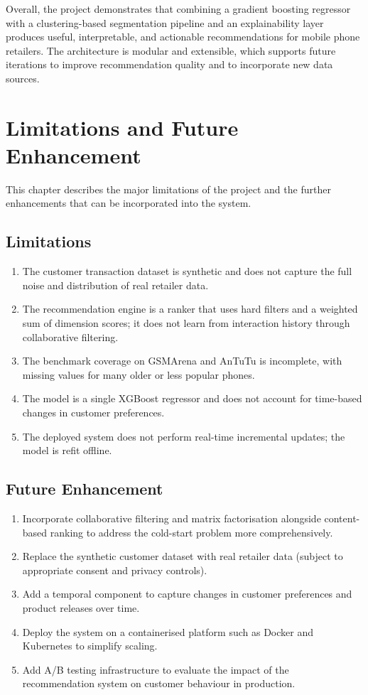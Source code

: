 \documentclass[12pt]{report}
\numberwithin{figure}{chapter}
\numberwithin{table}{chapter}
\numberwithin{equation}{chapter}
\begin{document}
Overall, the project demonstrates that combining a gradient boosting regressor with a clustering-based segmentation pipeline and an explainability layer produces useful, interpretable, and actionable recommendations for mobile phone retailers. The architecture is modular and extensible, which supports future iterations to improve recommendation quality and to incorporate new data sources.

\chapter{Limitations and Future Enhancement}
This chapter describes the major limitations of the project and the further enhancements that can be incorporated into the system.

\section{Limitations}

\begin{enumerate}
    \item The customer transaction dataset is synthetic and does not capture the full noise and distribution of real retailer data.
    \item The recommendation engine is a ranker that uses hard filters and a weighted sum of dimension scores; it does not learn from interaction history through collaborative filtering.
    \item The benchmark coverage on GSMArena and AnTuTu is incomplete, with missing values for many older or less popular phones.
    \item The model is a single XGBoost regressor and does not account for time-based changes in customer preferences.
    \item The deployed system does not perform real-time incremental updates; the model is refit offline.
\end{enumerate}

\section{Future Enhancement}

\begin{enumerate}
    \item Incorporate collaborative filtering and matrix factorisation alongside content-based ranking to address the cold-start problem more comprehensively.
    \item Replace the synthetic customer dataset with real retailer data (subject to appropriate consent and privacy controls).
    \item Add a temporal component to capture changes in customer preferences and product releases over time.
    \item Deploy the system on a containerised platform such as Docker and Kubernetes to simplify scaling.
    \item Add A/B testing infrastructure to evaluate the impact of the recommendation system on customer behaviour in production.
\end{enumerate}
\end{document}
